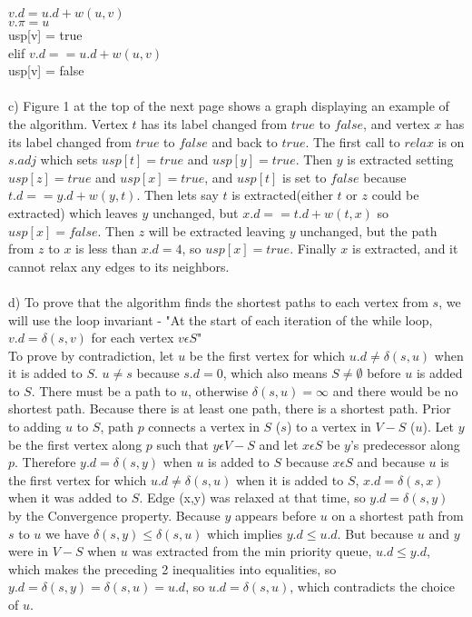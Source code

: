 \documentclass{article}
\begin{document}
\-\hspace{1cm}$v.d = u.d + w(u, v)$\\
\-\hspace{1cm}$v.\pi = u$\\
\-\hspace{1cm}usp[v] = true\\
\-\hspace{.5cm}elif $v.d == u.d + w(u, v)$\\
\-\hspace{1cm}usp[v] = false\\\\
c) Figure 1 at the top of the next page shows a graph displaying an example of the algorithm.  Vertex $t$ has its label changed from $true$ to $false$, and vertex $x$ has its label changed from $true$ to $false$ and back to $true$.  The first call to $relax$ is on $s.adj$ which sets $usp[t]=true$ and $usp[y]=true$.  Then $y$ is extracted setting $usp[z]=true$ and $usp[x]=true$, and $usp[t]$ is set to $false$ because $t.d==y.d+w(y,t)$.  Then lets say $t$ is extracted(either $t$ or $z$ could be extracted) which leaves $y$ unchanged, but $x.d==t.d+w(t,x)$ so $usp[x]=false$.  Then $z$ will be extracted leaving $y$ unchanged, but the path from $z$ to $x$ is less than $x.d=4$, so $usp[x]=true$.  Finally $x$ is extracted, and it cannot relax any edges to its neighbors.\\\\
d) To prove that the algorithm finds the shortest paths to each vertex from $s$, we will use the loop invariant - "At the start of each iteration of the while loop, $v.d = \delta(s,v)$ for each vertex $v \epsilon S$"\\
To prove by contradiction, let $u$ be the first vertex for which $u.d \neq \delta(s,u)$ when it is added to $S$. $u \neq s$ because $s.d=0$, which also means $S \neq \emptyset$ before $u$ is added to $S$. There must be a path to $u$, otherwise $\delta(s,u)=\infty$ and there would be no shortest path. Because there is at least one path, there is a shortest path. Prior to adding $u$ to $S$, path $p$ connects a vertex in $S$ ($s$) to a vertex in $V-S$ ($u$). Let $y$ be the first vertex along $p$ such that $y \epsilon V-S$ and let $x \epsilon S$ be $y$'s predecessor along $p$. Therefore $y.d=\delta(s,y)$ when $u$ is added to $S$ because $x \epsilon S$ and because $u$ is the first vertex for which $u.d \neq \delta(s,u)$ when it is added to $S$, $x.d=\delta(s,x)$ when it was added to $S$. Edge (x,y) was relaxed at that time, so $y.d=\delta(s,y)$ by the Convergence property. Because $y$ appears before $u$ on a shortest path from $s$ to $u$ we have $\delta(s,y) \leq \delta(s,u)$ which implies $y.d \leq u.d$. But because $u$ and $y$ were in $V-S$ when $u$ was extracted from the min priority queue, $u.d \leq y.d$, which makes the preceding 2 inequalities into equalities, so $y.d = \delta(s,y) = \delta(s,u) = u.d$, so $u.d=\delta(s,u)$, which contradicts the choice of $u$.\\
\end{document}
